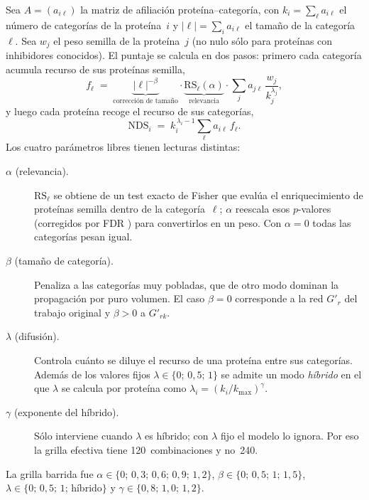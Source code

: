 \documentclass[11pt,a4paper]{article}
\newcommand{\NDS}{\mathrm{NDS}}
\newcommand{\RS}{\mathrm{RS}}
\begin{document}
Sea $A = (a_{i\ell})$ la matriz de afiliación proteína--categoría, con
$k_i = \sum_\ell a_{i\ell}$ el número de categorías de la proteína~$i$ y
$|\ell| = \sum_i a_{i\ell}$ el tamaño de la categoría~$\ell$. Sea $w_j$ el peso
semilla de la proteína~$j$ (no nulo sólo para proteínas con inhibidores
conocidos). El puntaje se calcula en dos pasos: primero cada categoría acumula
recurso de sus proteínas semilla,
%
\begin{equation}
  f_\ell \;=\; \underbrace{|\ell|^{-\beta}}_{\text{corrección de tamaño}}
               \cdot \underbrace{\RS_\ell(\alpha)}_{\text{relevancia}}
               \cdot \sum_{j} a_{j\ell}\,\frac{w_j}{k_j^{\lambda_j}},
  \label{eq:fl}
\end{equation}
%
y luego cada proteína recoge el recurso de sus categorías,
%
\begin{equation}
  \NDS_i \;=\; k_i^{\,\lambda_i - 1}\sum_\ell a_{i\ell}\, f_\ell .
  \label{eq:nds}
\end{equation}
%
Los cuatro parámetros libres tienen lecturas distintas:

\begin{description}
  \item[$\alpha$ (relevancia).] $\RS_\ell$ se obtiene de un test exacto de
    Fisher que evalúa el enriquecimiento de proteínas semilla dentro de la
    categoría~$\ell$; $\alpha$ reescala esos $p$-valores (corregidos por FDR
    \citep{benjamini1995}) para convertirlos en un peso. Con $\alpha = 0$ todas
    las categorías pesan igual.
  \item[$\beta$ (tamaño de categoría).] Penaliza a las categorías muy pobladas,
    que de otro modo dominan la propagación por puro volumen. El caso
    $\beta = 0$ corresponde a la red $G'_r$ del trabajo original y $\beta > 0$ a
    $G'_{rk}$.
  \item[$\lambda$ (difusión).] Controla cuánto se diluye el recurso de una
    proteína entre sus categorías. Además de los valores fijos
    $\lambda \in \{0;\,0{,}5;\,1\}$ se admite un modo \emph{híbrido} en el que
    $\lambda$ se calcula por proteína como
    $\lambda_i = (k_i / k_{\max})^{\gamma}$.
  \item[$\gamma$ (exponente del híbrido).] Sólo interviene cuando $\lambda$ es
    híbrido; con $\lambda$ fijo el modelo lo ignora. Por eso la grilla efectiva
    tiene 120~combinaciones y no~240.
\end{description}

La grilla barrida fue
$\alpha \in \{0;\,0{,}3;\,0{,}6;\,0{,}9;\,1{,}2\}$,
$\beta \in \{0;\,0{,}5;\,1;\,1{,}5\}$,
$\lambda \in \{0;\,0{,}5;\,1;\,\text{híbrido}\}$ y
$\gamma \in \{0{,}8;\,1{,}0;\,1{,}2\}$.
\end{document}
